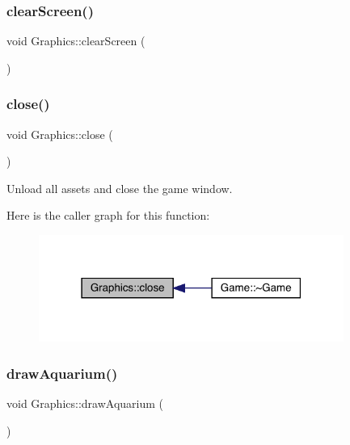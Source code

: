 \subsubsection{\texorpdfstring{clear\+Screen()}{clearScreen()}}
{\footnotesize\ttfamily void Graphics\+::clear\+Screen (\begin{DoxyParamCaption}{ }\end{DoxyParamCaption})}

\mbox{\label{class_graphics_a5285ec6ed237f24f7d7cf2423886a0cc}} 
\subsubsection{\texorpdfstring{close()}{close()}}
{\footnotesize\ttfamily void Graphics\+::close (\begin{DoxyParamCaption}{ }\end{DoxyParamCaption})}



Unload all assets and close the game window. 

Here is the caller graph for this function\+:\nopagebreak
\begin{figure}[H]
\begin{center}
\leavevmode
\includegraphics[width=283pt]{class_graphics_a5285ec6ed237f24f7d7cf2423886a0cc_icgraph}
\end{center}
\end{figure}
\mbox{\label{class_graphics_a5f3a657a7c54f13108bd90e6a85bd02e}} 
\subsubsection{\texorpdfstring{draw\+Aquarium()}{drawAquarium()}}
{\footnotesize\ttfamily void Graphics\+::draw\+Aquarium (\begin{DoxyParamCaption}{ }\end{DoxyParamCaption})}



